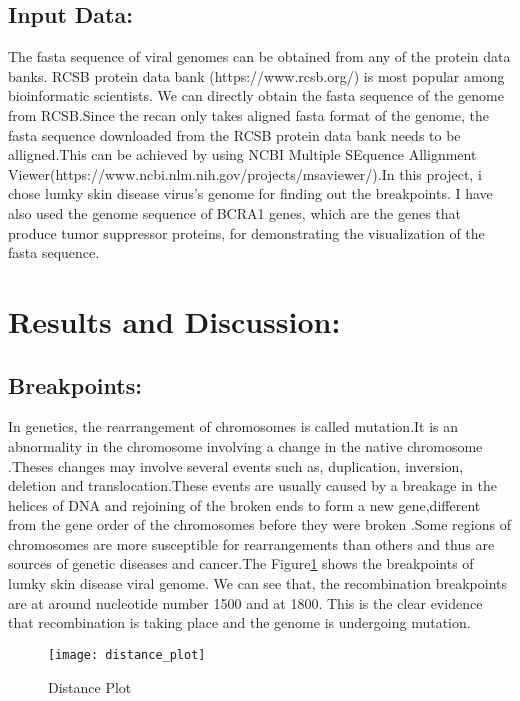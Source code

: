 \documentclass{article}
\begin{document}
\subsection{Input Data:}
The fasta sequence of viral genomes can be obtained from any of the protein data banks. RCSB protein data bank \cite{rose2016rcsb}(https://www.rcsb.org/) is most popular among bioinformatic  scientists.  We can directly obtain the fasta sequence of the genome from RCSB.Since the recan only takes aligned fasta format of the genome, the fasta sequence downloaded from the RCSB protein data bank needs to be alligned.This can be achieved by using NCBI Multiple SEquence Allignment Viewer(https://www.ncbi.nlm.nih.gov/projects/msaviewer/).In this project, i chose lumky skin disease virus's genome \cite{sprygin2018epidemiological} for finding out the breakpoints. I have also used the genome sequence of BCRA1 genes, which are the genes that produce tumor suppressor proteins, for demonstrating the visualization of the fasta sequence.

\section{Results and Discussion:}
\subsection{Breakpoints:}
In genetics, the rearrangement of chromosomes is called mutation.It is an abnormality in the chromosome involving a change in the native chromosome  \cite{zhao2012genome}.Theses changes may involve  several events such as, duplication, inversion, deletion and translocation.These events are usually caused by a breakage in the helices of DNA and rejoining of the broken ends to form a new gene,different from the gene order of the chromosomes before they were broken \cite{griffiths2002modern}.Some regions of chromosomes are more susceptible for rearrangements than others and thus are sources of genetic diseases and cancer.The Figure\ref{Figure:1} shows the breakpoints of lumky skin disease viral genome. We can see that, the recombination breakpoints are at around nucleotide number 1500 and at 1800. This is the clear evidence that recombination is taking place and the genome is undergoing mutation.
\begin{figure}
    \centering
    \texttt{[image: distance\_plot]}
    \caption{Distance Plot}
    \label{Figure:1}
\end{figure}
\end{document}
